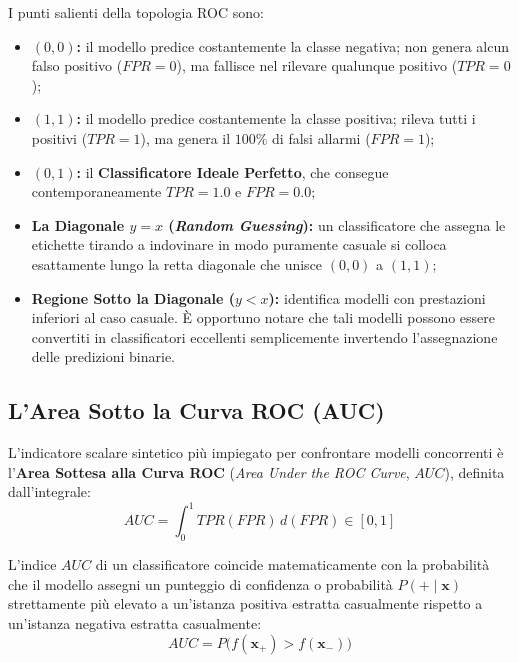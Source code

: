 I punti salienti della topologia ROC sono:
\begin{itemize}
    \item \textbf{$(0, 0)$:} il modello predice costantemente la classe negativa; non genera alcun falso positivo ($FPR = 0$), ma fallisce nel rilevare qualunque positivo ($TPR = 0$);
    \item \textbf{$(1, 1)$:} il modello predice costantemente la classe positiva; rileva tutti i positivi ($TPR = 1$), ma genera il $100\%$ di falsi allarmi ($FPR = 1$);
    \item \textbf{$(0, 1)$:} il \textbf{Classificatore Ideale Perfetto}, che consegue contemporaneamente $TPR = 1.0$ e $FPR = 0.0$;
    \item \textbf{La Diagonale $y = x$ (\textit{Random Guessing}):} un classificatore che assegna le etichette tirando a indovinare in modo puramente casuale si colloca esattamente lungo la retta diagonale che unisce $(0, 0)$ a $(1, 1)$;
    \item \textbf{Regione Sotto la Diagonale ($y < x$):} identifica modelli con prestazioni inferiori al caso casuale. È opportuno notare che tali modelli possono essere convertiti in classificatori eccellenti semplicemente invertendo l'assegnazione delle predizioni binarie.
\end{itemize}

\FloatBarrier
\subsection{L'Area Sotto la Curva ROC (AUC)}
\label{subsec:dm-roc-auc}

L'indicatore scalare sintetico più impiegato per confrontare modelli concorrenti è l'\textbf{Area Sottesa alla Curva ROC} (\textit{Area Under the ROC Curve}, $AUC$), definita dall'integrale:
\begin{equation}
    AUC = \int_0^1 TPR(FPR) \, d(FPR) \in [0, 1]
\end{equation}

\begin{theorem}
L'indice $AUC$ di un classificatore coincide matematicamente con la probabilità che il modello assegni un punteggio di confidenza o probabilità $P(+ \mid \mathbf{x})$ strettamente più elevato a un'istanza positiva estratta casualmente rispetto a un'istanza negativa estratta casualmente:
\begin{equation}
    AUC = P\big( f(\mathbf{x}_+) > f(\mathbf{x}_-) \big)
\end{equation}
\end{theorem}

